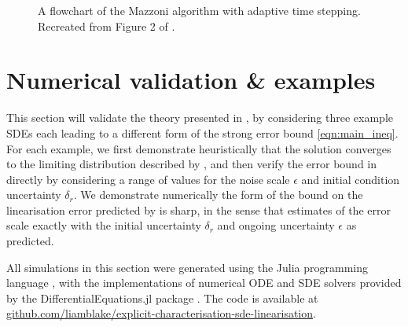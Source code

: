 \begin{figure}
\begin{center}
		\caption{A flowchart of the Mazzoni algorithm with adaptive time stepping.
			Recreated from Figure 2 of \citet{Mazzoni_2008_ComputationalAspectsContinuous}.}
		\label{fig:mazzoni_alg}
	\end{center}
\end{figure}




\section{Numerical validation \& examples}\label{sec:numerics}
This section will validate the theory presented in , by considering three example SDEs each leading to a different form of the strong error bound \cref{eqn:main_ineq}.
For each example, we first demonstrate heuristically that the solution converges to the limiting distribution described by , and then verify the error bound in  directly by considering a range of values for the noise scale \(\epsilon\) and initial condition uncertainty \(\delta_r\).
We demonstrate numerically the form of the bound on the linearisation error predicted by  is sharp, in the sense that estimates of the error scale exactly with the initial uncertainty \(\delta_r\) and ongoing uncertainty \(\epsilon\) as predicted.


All simulations in this section were generated using the Julia programming language \citep{BezansonEtAl_2017_JuliaFreshApproach}, with the implementations of numerical ODE and SDE solvers provided by the DifferentialEquations.jl package \citep{RackauckasNie_2017_DifferentialEquationsJlPerformant}.
The code is available at \href{https://github.com/liamblake/explicit-characterisation-sde-linearisation}{github.com/liamblake/explicit-characterisation-sde-linearisation}.




